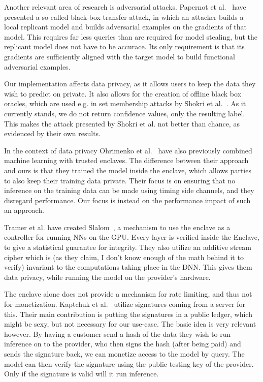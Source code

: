 \documentclass[11pt]{article}
\begin{document}
Another relevant area of research is adversarial attacks.
Papernot et al.~\cite{papernot_practical_2017} have presented a so-called black-box transfer attack, in which an attacker builds a local replicant model and builds adversarial examples on the gradients of that model.
This requires far less queries than are required for model stealing, but the replicant model does not have to be accurace.
Its only requirement is that its gradients are sufficiently aligned with the target model to build functional adversarial examples.

Our implementation affects data privacy, as it allows users to keep the data they wish to predict on private.
It also allows for the creation of offline black box oracles, which are used e.g. in set membership attacks by Shokri et al.~\cite{shokri_membership_2017}.
As it currently stands, we do not return confidence values, only the resulting label.
This makes the attack presented by Shokri et al. not better than chance, as evidenced by their own results.

In the context of data privacy Ohrimenko et al.~\cite{ohrimenko_oblivious_2016} have also previously combined machine learning with trusted enclaves.
The difference between their approach and ours is that they trained the model inside the enclave, which allows parties to also keep their training data private.
Their focus is on ensuring that no inference on the training data can be made using timing side channels, and they disregard performance.
Our focus is instead on the performance impact of such an approach.

Tramer et al. have created Slalom~\cite{tramer_slalom_2019}, a mechanism to use the enclave as a controller for running NNs on the GPU.
Every layer is verified inside the Enclave, to give a statistical guarantee for integrity.
They also utilize an additive stream cipher which is (as they claim, I don't know enough of the math behind it to verify) invariant to the computations taking place in the DNN.
This gives them data privacy, while running the model on the provider's hardware.

The enclave alone does not provide a mechanism for rate limiting, and thus not for monetization.
Kaptchuk et al.~\cite{kaptchuk_giving_nodate} utilize signatures coming from a server for this.
Their main contribution is putting the signatures in a public ledger, which might be sexy, but not necessary for our use-case.
The basic idea is very relevant however.
By having a customer send a hash of the data they wish to run inference on to the provider, who then signs the hash (after being paid) and sends the signature back, we can monetize access to the model by query.
The model can then verify the signature using the public testing key of the provider.
Only if the signature is valid will it run inference.
\end{document}
